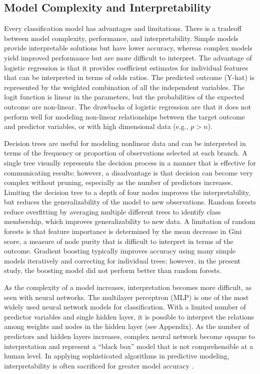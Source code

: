 \documentclass[sigconf]{acmart}
\begin{document}
\subsection{Model Complexity and Interpretability}

Every classification model has advantages and limitations. There is a 
tradeoff between model complexity, performance, and interpretability.
Simple models provide interpretable solutions but have lower accuracy, 
whereas complex models yield improved performance but are more difficult 
to interpret. The advantage of logistic regression is that it provides 
coefficient estimates for individual features that can be interpreted in 
terms of odds ratios. The predicted outcome (Y-hat) is represented by the
weighted combination of all the independent variables. The logit function 
is linear in the parameters, but the probabilities of the expected outcome 
are non-linear. The drawbacks of logistic regression are that it does not 
perform well for modeling non-linear relationships between the target
outcome and predictor variables, or with high dimensional data (e.g., $p>n$). 

Decision trees are useful for modeling nonlinear data and can be 
interpreted in terms of the frequency or proportion of observations selected 
at each branch. A single tree visually represents the decision process in a 
manner that is effective for communicating results; however, a disadvantage 
is that decision can become very complex without pruning, especially as the 
number of predictors increases. Limiting the decision tree to a depth of four 
nodes improves the interpretability, but reduces the generalizability of the 
model to new observations. Random forests reduce overfitting by averaging
multiple different trees to identify class membership, which improves 
generalizability to new data. A limitation of random forests is that feature 
importance is determined by the mean decrease in Gini score, a measure of node
purity that is difficult to interpret in terms of the outcome. Gradient 
boosting typically improves accuracy using many simple models iteratively and 
correcting for individual trees; however, in the present study, the boosting 
model did not perform better than random forests. 

As the complexity of a model increases, interpretation becomes more difficult, 
as seen with neural networks. The multilayer perceptron (MLP) is one of the 
most widely used neural network models for classification. With a limited 
number of predictor variables and single hidden layer, it is possible to 
interpret the relations among weights and nodes in the hidden layer 
(see Appendix). As the number of predictors and hidden layers increases, 
complex neural network become opaque to interpretation and represent a 
``black box'' model that is not comprehensible at a human level. In 
applying sophisticated algorithms in predictive modeling, interpretability 
is often sacrificed for greater model accuracy \cite{elgin18}. 
\end{document}
